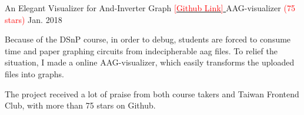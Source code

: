 \begin{cventries}
  \cventry
    {An Elegant Visualizer for And-Inverter Graph \href{https://github.com/ByronHsu/AAG-Visualizer}{ \textcolor{red}{[Github Link]} }} %
    {AAG-visualizer \textcolor{red}{(75 stars)}} %
    {} %
    {Jan. 2018} %
    {
      \begin{cvitems} %
        \item {Because of the DSnP course, in order to debug, students are forced to consume time and paper graphing circuits from indecipherable aag files. To relief the situation, I made a online AAG-visualizer, which easily transforms the uploaded files into graphs.}
        \item {The project received a lot of praise from both course takers and Taiwan Frontend Club, with more than 75 stars on Github.}
      \end{cvitems}
    }
\end{cventries}

